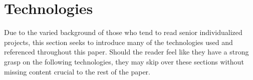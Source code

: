 \section{Technologies}
Due to the varied background of those who tend to read senior individualized projects, this section seeks to introduce many of the technologies used and referenced throughout this paper.  Should the reader feel like they have a strong grasp on the following technologies, they may skip over these sections without missing content crucial to the rest of the paper.



